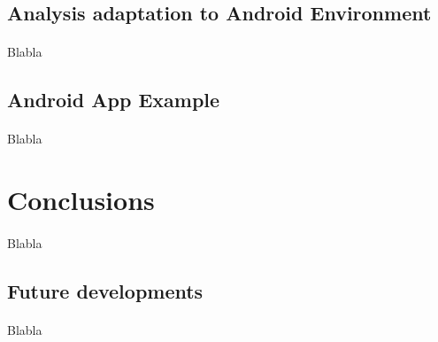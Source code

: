 \documentclass[letterpaper,twocolumn,10pt]{article}
\begin{document}
\subsection{Analysis adaptation to Android Environment}
\paragraph{}
Blabla

\subsection{Android App Example}
\paragraph{}
Blabla


\section{Conclusions}
\paragraph{}
Blabla

\subsection{Future developments}
\paragraph{}
Blabla


{\footnotesize 

}

\theendnotes

\end{document}
